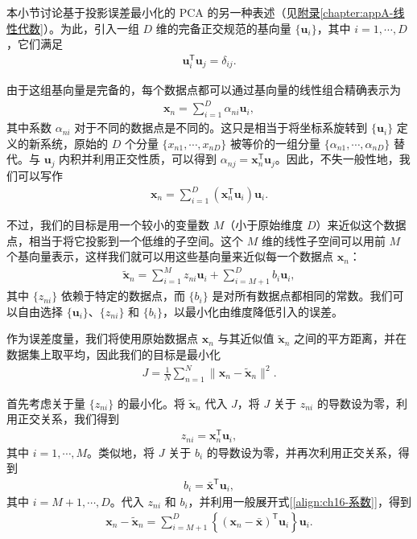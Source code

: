 \documentclass[../../main.tex]{subfiles}
\begin{document}
本小节讨论基于投影误差最小化的 PCA 的另一种表述（见\hyperref[chapter:appA-线性代数]{附录\ref*{chapter:appA-线性代数}}）。为此，引入一组 $D$ 维的完备正交规范的基向量 $\{\bm{u}_i\}$，其中 $i=1,\cdots,D$，它们满足
\begin{align}
  \bm{u}_i^{\mathsf T}\bm{u}_j=\delta_{ij}.
  \label{align:ch16-正交基}
\end{align}

由于这组基向量是完备的，每个数据点都可以通过基向量的线性组合精确表示为
\begin{align}
  \bm{x}_n=\sum_{i=1}^{D}\alpha_{ni}\bm{u}_i,
  \label{align:ch16-基展开}
\end{align}
其中系数 $\alpha_{ni}$ 对于不同的数据点是不同的。这只是相当于将坐标系旋转到 $\{\bm{u}_i\}$ 定义的新系统，原始的 $D$ 个分量 $\{x_{n1},\cdots,x_{nD}\}$ 被等价的一组分量 $\{\alpha_{n1},\cdots,\alpha_{nD}\}$ 替代。与 $\bm{u}_j$ 内积并利用正交性质，可以得到 $\alpha_{nj}=\bm{x}_n^{\mathsf T}\bm{u}_j$。因此，不失一般性地，我们可以写作
\begin{align}
  \bm{x}_n=\sum_{i=1}^{D}\left(\bm{x}_n^{\mathsf T}\bm{u}_i\right)\bm{u}_i.
  \label{align:ch16-系数}
\end{align}

不过，我们的目标是用一个较小的变量数 $M$（小于原始维度 $D$）来近似这个数据点，相当于将它投影到一个低维的子空间。这个 $M$ 维的线性子空间可以用前 $M$ 个基向量表示，这样我们就可以用这些基向量来近似每一个数据点 $\bm{x}_n$：
\begin{align}
  \tilde{\bm{x}}_n=\sum_{i=1}^{M}z_{ni}\bm{u}_i+\sum_{i=M+1}^{D}b_i\bm{u}_i,
  \label{align:ch16-近似}
\end{align}
其中 $\{z_{ni}\}$ 依赖于特定的数据点，而 $\{b_i\}$ 是对所有数据点都相同的常数。我们可以自由选择 $\{\bm{u}_i\}$、$\{z_{ni}\}$ 和 $\{b_i\}$，以最小化由维度降低引入的误差。

作为误差度量，我们将使用原始数据点 $\bm{x}_n$ 与其近似值 $\tilde{\bm{x}}_n$ 之间的平方距离，并在数据集上取平均，因此我们的目标是最小化
\begin{align}
  J=\frac{1}{N}\sum_{n=1}^{N}\|\bm{x}_n-\tilde{\bm{x}}_n\|^2.
  \label{align:ch16-重建误差}
\end{align}

首先考虑关于量 $\{z_{ni}\}$ 的最小化。将 $\tilde{\bm{x}}_n$ 代入 $J$，将 $J$ 关于 $z_{ni}$ 的导数设为零，利用正交关系，我们得到
\begin{align}
  z_{ni}=\bm{x}_n^{\mathsf T}\bm{u}_i,
  \label{align:ch16-z最优}
\end{align}
其中 $i=1,\cdots,M$。类似地，将 $J$ 关于 $b_i$ 的导数设为零，并再次利用正交关系，得到
\begin{align}
  b_i=\bar{\bm{x}}^{\mathsf T}\bm{u}_i,
  \label{align:ch16-b最优}
\end{align}
其中 $i=M+1,\cdots,D$。代入 $z_{ni}$ 和 $b_i$，并利用一般展开式[\eqref{align:ch16-系数}]，得到
\begin{align}
  \bm{x}_n-\tilde{\bm{x}}_n=\sum_{i=M+1}^{D}\left\{(\bm{x}_n-\bar{\bm{x}})^{\mathsf T}\bm{u}_i\right\}\bm{u}_i.
  \label{align:ch16-残差}
\end{align}
\end{document}
